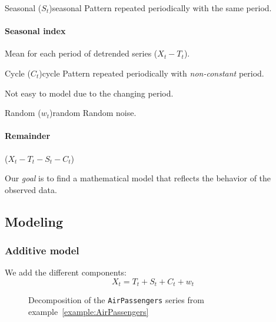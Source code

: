 \begin{definition}{Seasonal ($S_t$)}{seasonal}
	Pattern repeated periodically with the same period.

	\paragraph{Seasonal index} Mean for each period of detrended series ($X_t - T_t$).
\end{definition}

\begin{definition}{Cycle ($C_t$)}{cycle}
	Pattern repeated periodically with \emph{non-constant} period.

	\vspace{1em}
	\begin{marker}
		Not easy to model due to the changing period.
	\end{marker}
\end{definition}

\begin{definition}{Random ($w_t$)}{random}
	Random noise.

	\paragraph{Remainder} ($X_t - T_t - S_t - C_t$)
\end{definition}

Our \emph{goal} is to find a mathematical model that reflects the behavior of the observed
data.

\subsection{Modeling}

\subsubsection{Additive model}
We add the different components:
\begin{equation}
	X_t = T_t + S_t + C_t + w_t \tag{additive}
\end{equation}

\begin{figure}[H]
	\caption{Decomposition of the \texttt{AirPassengers} series from example~\ref{example:AirPassengers}}
\end{figure}


